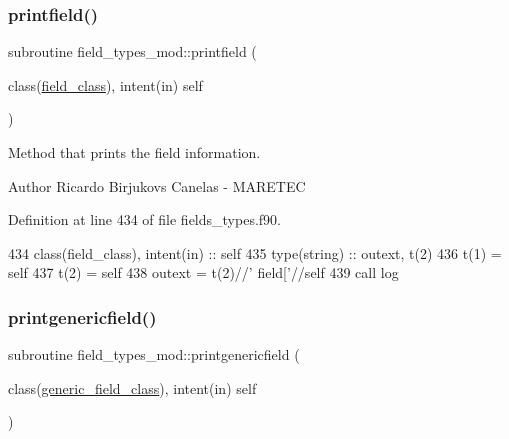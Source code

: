 \subsubsection{\texorpdfstring{printfield()}{printfield()}}
{\footnotesize\ttfamily subroutine field\+\_\+types\+\_\+mod\+::printfield (\begin{DoxyParamCaption}\item[{class(\mbox{\hyperlink{structfield__types__mod_1_1field__class}{field\+\_\+class}}), intent(in)}]{self }\end{DoxyParamCaption})\hspace{0.3cm}{\ttfamily [private]}}



Method that prints the field information. 

\begin{DoxyAuthor}{Author}
Ricardo Birjukovs Canelas -\/ M\+A\+R\+E\+T\+EC 
\end{DoxyAuthor}


Definition at line 434 of file fields\+\_\+types.\+f90.


\begin{DoxyCode}
434     \textcolor{keywordtype}{class}(field\_class), \textcolor{keywordtype}{intent(in)} :: self
435     \textcolor{keywordtype}{type}(string) :: outext, t(2)
436     t(1) = self%
437     t(2) = self%
438     outext = t(2)//\textcolor{stringliteral}{' field['}//self%
439     \textcolor{keyword}{call }log%
\end{DoxyCode}
\mbox{\label{namespacefield__types__mod_a9b7f13b8dea24ec75f1a017a943a3fb5}} 
\subsubsection{\texorpdfstring{printgenericfield()}{printgenericfield()}}
{\footnotesize\ttfamily subroutine field\+\_\+types\+\_\+mod\+::printgenericfield (\begin{DoxyParamCaption}\item[{class(\mbox{\hyperlink{structfield__types__mod_1_1generic__field__class}{generic\+\_\+field\+\_\+class}}), intent(in)}]{self }\end{DoxyParamCaption})\hspace{0.3cm}{\ttfamily [private]}}




